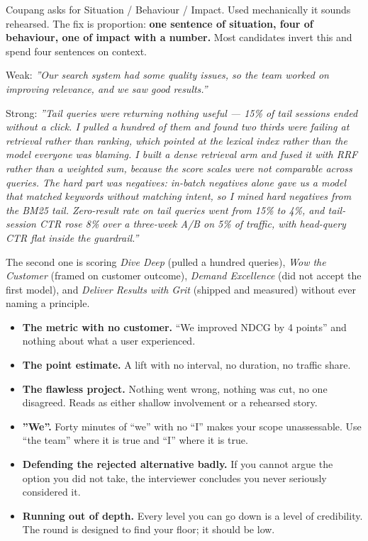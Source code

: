 \documentclass[10pt,twoside]{book}
\newcommand{\csection}[1]{\par\vspace{13pt}\noindent{\sffamily\large\bfseries\color{ink}\raggedright #1\par}\vspace{4pt}}
\begin{document}
\csection{SBI, without sounding like a template}
Coupang asks for Situation / Behaviour / Impact. Used mechanically it sounds rehearsed. The fix is proportion: \textbf{one sentence of situation, four of behaviour, one of impact with a number.} Most candidates invert this and spend four sentences on context.\par
Weak: \textit{''Our search system had some quality issues, so the team worked on improving relevance, and we saw good results.''}\par
Strong: \textit{''Tail queries were returning nothing useful --- 15\% of tail sessions ended without a click. I pulled a hundred of them and found two thirds were failing at retrieval rather than ranking, which pointed at the lexical index rather than the model everyone was blaming. I built a dense retrieval arm and fused it with RRF rather than a weighted sum, because the score scales were not comparable across queries. The hard part was negatives: in-batch negatives alone gave us a model that matched keywords without matching intent, so I mined hard negatives from the BM25 tail. Zero-result rate on tail queries went from 15\% to 4\%, and tail-session CTR rose 8\% over a three-week A/B on 5\% of traffic, with head-query CTR flat inside the guardrail.''}\par
The second one is scoring \textit{Dive Deep} (pulled a hundred queries), \textit{Wow the Customer} (framed on customer outcome), \textit{Demand Excellence} (did not accept the first model), and \textit{Deliver Results with Grit} (shipped and measured) without ever naming a principle.\par
\csection{Anti-patterns}
\begin{itemize}
\item \textbf{The metric with no customer.} ``We improved NDCG by 4 points'' and nothing about what a user experienced.
\item \textbf{The point estimate.} A lift with no interval, no duration, no traffic share.
\item \textbf{The flawless project.} Nothing went wrong, nothing was cut, no one disagreed. Reads as either shallow involvement or a rehearsed story.
\item \textbf{''We''.} Forty minutes of ``we'' with no ``I'' makes your scope unassessable. Use ``the team'' where it is true and ``I'' where it is true.
\item \textbf{Defending the rejected alternative badly.} If you cannot argue the option you did not take, the interviewer concludes you never seriously considered it.
\item \textbf{Running out of depth.} Every level you can go down is a level of credibility. The round is designed to find your floor; it should be low.
\end{itemize}
\end{document}
